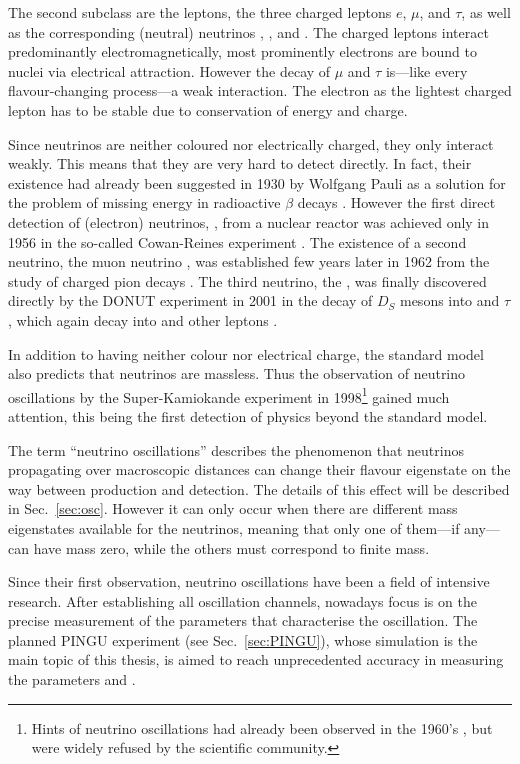 The second subclass are the leptons, the three charged leptons $e$, $\mu$, and
$\tau$, as well as the corresponding (neutral) neutrinos \nue, \numu, and
\nutau. The charged leptons interact predominantly electromagnetically, most
prominently electrons are bound to nuclei via electrical attraction. However
the decay of $\mu$ and $\tau$ is---like every flavour-changing process---a weak
interaction. The electron as the lightest charged lepton has to be stable due
to conservation of energy and charge.

Since neutrinos are neither coloured nor electrically charged, they only
interact weakly. This means that they are very hard to detect directly. In
fact, their existence had already been suggested in 1930 by Wolfgang Pauli as a
solution for the problem of missing energy in radioactive $\beta$ decays
\cite{PauliBeta}. However the first direct detection of (electron) neutrinos,
\nue, from a nuclear reactor was achieved only in 1956 in the so-called
Cowan-Reines experiment \cite{CowanReines}. The existence of a second neutrino,
the muon neutrino \numu, was established few years later in 1962 from the study
of charged pion decays \cite{NuMuDiscovery}. The third neutrino, the \nutau,
was finally discovered directly by the DONUT experiment in 2001 in the decay of
$D_S$ mesons into \nutaubar and $\tau$, which again decay into \nutau and other
leptons \cite{DONUT}.

In addition to having neither colour nor electrical charge, the standard model
also predicts that neutrinos are massless. Thus the observation of neutrino
oscillations by the Super-Kamiokande experiment in 1998\footnote{Hints of
neutrino oscillations had already been observed in the 1960's
\cite{DaviesNuOsc}, but were widely refused by the scientific community.}
\cite{SuperKosc} gained much attention, this being the first detection of
physics beyond the standard model.

The term ``neutrino oscillations'' describes the phenomenon that neutrinos 
propagating over macroscopic distances can change their flavour eigenstate on
the way between production and detection. The details of this effect will be
described in Sec.~\ref{sec:osc}. However it can only occur when there are
different mass eigenstates available for the neutrinos, meaning that only one of
them---if any---can have mass zero, while the others must correspond to finite
mass.

Since their first observation, neutrino oscillations have been a field of
intensive research. After establishing all oscillation channels, nowadays
focus is on the precise measurement of the parameters that characterise the
oscillation. The planned PINGU experiment (see Sec.~\ref{sec:PINGU}), whose
simulation is the main topic of this thesis, is aimed to reach unprecedented
accuracy in measuring the parameters  and .


